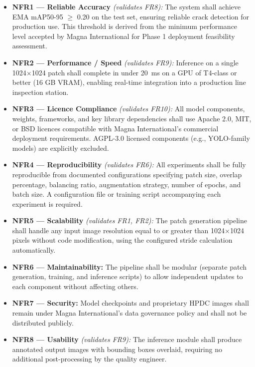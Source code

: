 \begin{itemize}[leftmargin=2em]
    \item \textbf{NFR1 --- Reliable Accuracy} \textit{(validates FR8):} The system shall achieve EMA mAP50-95 $\geq$ 0.20 on the test set, ensuring reliable crack detection for production use. This threshold is derived from the minimum performance level accepted by Magna International for Phase 1 deployment feasibility assessment.

    \item \textbf{NFR2 --- Performance / Speed} \textit{(validates FR9):} Inference on a single 1024$\times$1024 patch shall complete in under 20~ms on a GPU of T4-class or better (16 GB VRAM), enabling real-time integration into a production line inspection station.

    \item \textbf{NFR3 --- Licence Compliance} \textit{(validates FR10):} All model components, weights, frameworks, and key library dependencies shall use Apache 2.0, MIT, or BSD licences compatible with Magna International's commercial deployment requirements. AGPL-3.0 licensed components (e.g., YOLO-family models) are explicitly excluded.

    \item \textbf{NFR4 --- Reproducibility} \textit{(validates FR6):} All experiments shall be fully reproducible from documented configurations specifying patch size, overlap percentage, balancing ratio, augmentation strategy, number of epochs, and batch size. A configuration file or training script accompanying each experiment is required.

    \item \textbf{NFR5 --- Scalability} \textit{(validates FR1, FR2):} The patch generation pipeline shall handle any input image resolution equal to or greater than 1024$\times$1024 pixels without code modification, using the configured stride calculation automatically.

    \item \textbf{NFR6 --- Maintainability:} The pipeline shall be modular (separate patch generation, training, and inference scripts) to allow independent updates to each component without affecting others.

    \item \textbf{NFR7 --- Security:} Model checkpoints and proprietary HPDC images shall remain under Magna International's data governance policy and shall not be distributed publicly.

    \item \textbf{NFR8 --- Usability} \textit{(validates FR9):} The inference module shall produce annotated output images with bounding boxes overlaid, requiring no additional post-processing by the quality engineer.
\end{itemize}

